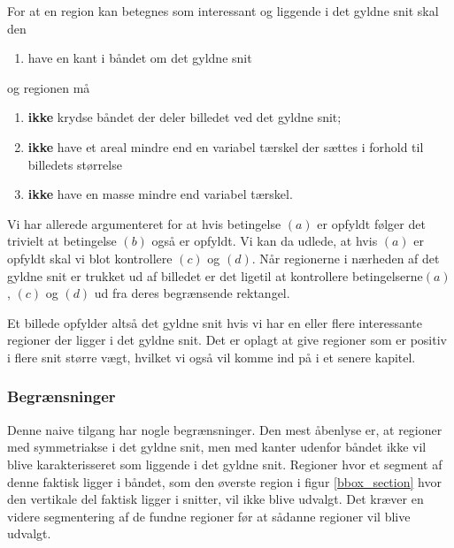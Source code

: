 {\noindent For at en region kan betegnes som interessant og liggende i
det gyldne snit skal den
\begin{enumerate}
	\renewcommand{\labelenumi}{(\alph{enumi})}
	\item have en kant i båndet om det gyldne snit
\end{enumerate}
og regionen må
\begin{enumerate}
	\renewcommand{\labelenumi}{(\alph{enumi})}
	\setcounter{enumi}{1}
	\item \textbf{ikke} krydse båndet der deler billedet ved det gyldne snit;
	\item \textbf{ikke} have et areal mindre end en variabel tærskel der sættes i
		forhold til billedets størrelse
	\item \textbf{ikke} have en masse mindre end variabel tærskel.
\end{enumerate}
Vi har allerede argumenteret for at hvis betingelse $(a)$ er opfyldt
følger det trivielt at betingelse $(b)$ også er opfyldt.  Vi kan da
udlede, at hvis $(a)$ er opfyldt skal vi blot kontrollere $(c)$ og
$(d)$.  Når regionerne i nærheden af det gyldne snit er trukket ud af
billedet er det ligetil at kontrollere betingelserne$(a)$, $(c)$ og
$(d)$ ud fra deres begrænsende rektangel.

Et billede opfylder altså det gyldne snit hvis vi har en eller flere
interessante regioner der ligger i det gyldne snit.  Det er oplagt at
give regioner som er positiv i flere snit større vægt, hvilket vi også
vil komme ind på i et senere kapitel.

\subsubsection{Begrænsninger}
Denne naive tilgang har nogle begrænsninger.  Den mest åbenlyse er, at
regioner med symmetriakse i det gyldne snit, men med kanter udenfor
båndet ikke vil blive karakterisseret som liggende i det gyldne snit.
Regioner hvor et segment af denne faktisk ligger i båndet, som den
øverste region i figur \ref{bbox_section} hvor den vertikale del faktisk
ligger i snitter, vil ikke blive udvalgt.  Det kræver en videre
segmentering af de fundne regioner før at sådanne regioner vil blive
udvalgt.

}

